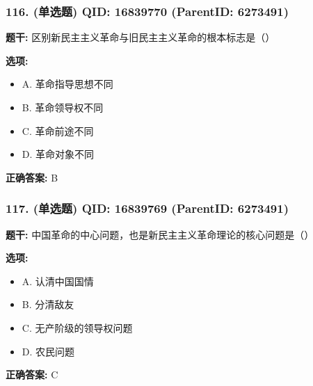 \documentclass[12pt,UTF8]{ctexart}
\begin{document}
\vspace{0.3em}\hrulefill\vspace{0.7em}

\subsubsection*{116. (单选题) \small QID: 16839770 (ParentID: 6273491)}

\textbf{题干:}
区别新民主主义革命与旧民主主义革命的根本标志是（）



\textbf{选项:}
\begin{itemize}[leftmargin=*]

  \item A. 革命指导思想不同

  \item B. 革命领导权不同

  \item C. 革命前途不同

  \item D. 革命对象不同

\end{itemize}

\textbf{正确答案:}
B

\vspace{0.3em}\hrulefill\vspace{0.7em}

\subsubsection*{117. (单选题) \small QID: 16839769 (ParentID: 6273491)}

\textbf{题干:}
中国革命的中心问题，也是新民主主义革命理论的核心问题是（）



\textbf{选项:}
\begin{itemize}[leftmargin=*]

  \item A. 认清中国国情

  \item B. 分清敌友

  \item C. 无产阶级的领导权问题

  \item D. 农民问题

\end{itemize}

\textbf{正确答案:}
C

\vspace{0.3em}\hrulefill\vspace{0.7em}
\end{document}
